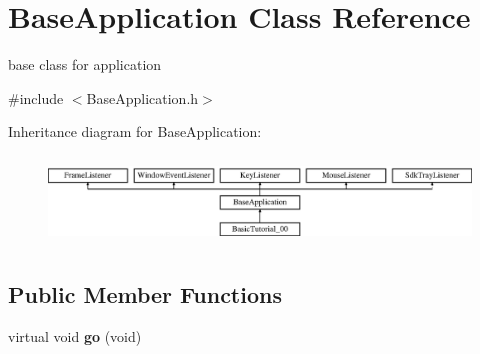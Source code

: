 \hypertarget{class_base_application}{}\section{Base\+Application Class Reference}
\label{class_base_application}


base class for application  




{\ttfamily \#include $<$Base\+Application.\+h$>$}

Inheritance diagram for Base\+Application\+:\begin{figure}[H]
\begin{center}
\leavevmode
\includegraphics[height=2.382979cm]{class_base_application}
\end{center}
\end{figure}
\subsection*{Public Member Functions}
\begin{DoxyCompactItemize}
\item 
virtual void {\bfseries go} (void)\hypertarget{class_base_application_a8a14a65a29118dd75173aa68678a05e1}{}\label{class_base_application_a8a14a65a29118dd75173aa68678a05e1}

\end{DoxyCompactItemize}
